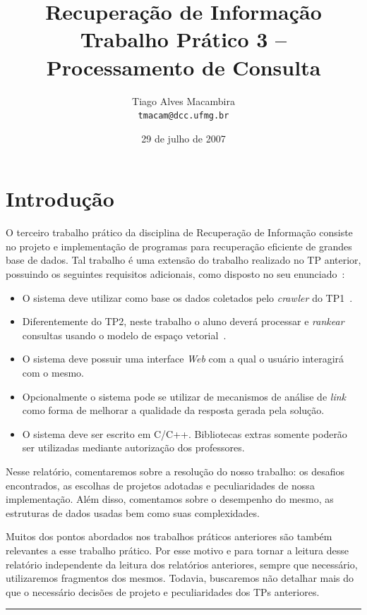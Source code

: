 \documentclass[10pt,twocolumn]{article}
\title{Recuperação de Informação \\Trabalho Prático 3 -- Processamento
de Consulta}
\author{Tiago Alves Macambira \\ \texttt{tmacam@dcc.ufmg.br}}
\date{29 de julho de 2007}
\begin{document}
\maketitle

\section{Introdução}

O terceiro trabalho prático da disciplina de Recuperação de Informação
consiste no projeto e implementação de programas para
recuperação eficiente de grandes base de dados. Tal trabalho é uma
extensão do trabalho realizado no TP anterior, possuindo os seguintes
requisitos adicionais, como disposto no seu enunciado~\cite{tp3}:
\begin{itemize}
\item O sistema deve utilizar como base os dados coletados pelo
\emph{crawler} do TP1~\cite{tp1}.
\item Diferentemente do TP2, neste trabalho o aluno deverá processar e
\emph{rankear} consultas usando o modelo de espaço
vetorial~\cite{tp2}.
\item O sistema deve possuir uma interface \emph{Web} com a qual
o usuário interagirá com o mesmo.
\item Opcionalmente o sistema pode se utilizar de mecanismos de análise
de \emph{link} como forma de melhorar a qualidade da resposta gerada
pela solução.
\item O sistema deve ser escrito em C/C++. Bibliotecas extras somente
poderão ser utilizadas mediante autorização dos professores.
\end{itemize}

Nesse relatório, comentaremos sobre a resolução do nosso trabalho:
os desafios encontrados, as escolhas de projetos
adotadas e peculiaridades de nossa implementação. Além disso, comentamos
sobre o desempenho do mesmo, as estruturas de dados usadas bem como suas
complexidades.

Muitos dos pontos abordados nos trabalhos práticos anteriores são também
relevantes a esse trabalho prático. Por esse motivo e para tornar a
leitura desse relatório independente da leitura dos relatórios
anteriores, sempre que necessário, utilizaremos fragmentos dos mesmos.
Todavia, buscaremos não detalhar mais do que o necessário decisões
de projeto e peculiaridades dos TPs anteriores.

\vspace{0.5cm}
\rule[0.5mm]{0.9\linewidth}{0.5mm}
\end{document}
